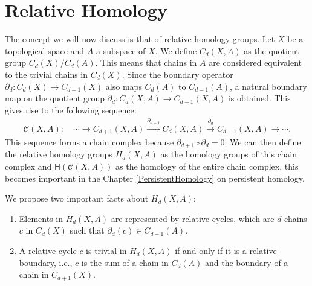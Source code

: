 \section{Relative Homology}
\label{RelativeHomology}
The concept we will now discuss is that of relative homology groups. Let \( X \) be a topological space and \( A \) a subspace of \( X \). We define \( C_{d}(X, A) \) as the quotient group \( C_{d}(X) / C_{d}(A) \). This means that chains in \( A \) are considered equivalent to the trivial chains in \( C_{d}(X) \). Since the boundary operator \( \partial_{d}: C_{d}(X) \rightarrow C_{d-1}(X) \) also maps \( C_{d}(A) \) to \( C_{d-1}(A) \), a natural boundary map on the quotient group \( \partial_{d}: C_{d}(X, A) \rightarrow C_{d-1}(X, A) \) is obtained. This gives rise to the following sequence:
\begin{align}
	\mathcal{C}(X,A): \quad \cdots \rightarrow C_{d+1}(X, A) \xrightarrow{\partial_{d+1}} C_{d}(X, A) \xrightarrow{\partial_{d}} C_{d-1}(X, A) \rightarrow \cdots. 
\end{align}
This sequence forms a chain complex because \( \partial_{d+1} \circ \partial_{d} = 0 \). We can then define the relative homology groups \( H_{d}(X, A)\) as the homology groups of this chain complex and $\mathsf{H}(\mathcal{C}(X,A))$ as the homology of the entire chain complex, this becomes important in the Chapter \ref{PersistentHomology} on persistent homology.

We propose two important facts about \( H_{d}(X, A) \):

\begin{proposition}{\cite[\S 2.1, p.115]{hatcher2005algebraic}}
	\begin{enumerate}
		\item Elements in \( H_{d}(X, A) \) are represented by relative cycles, which are \( d \)-chains \( c \) in \( C_{d}(X) \) such that \( \partial_{d}(c) \in C_{d-1}(A) \).
		\item A relative cycle \( c \) is trivial in \( H_{d}(X, A) \) if and only if it is a relative boundary, i.e., \( c \) is the sum of a chain in \( C_{d}(A) \) and the boundary of a chain in \( C_{d+1}(X) \).
	\end{enumerate}
\end{proposition}

